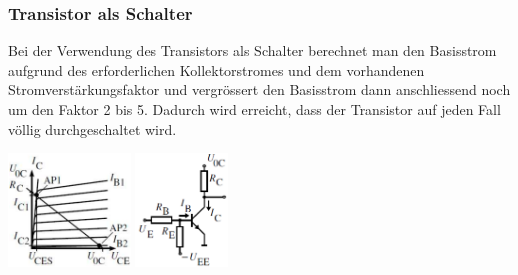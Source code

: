         \subsubsection{Transistor als Schalter}
            \begin{minipage}[T]{13cm}
                Bei der Verwendung des Transistors als Schalter berechnet man den Basisstrom aufgrund des erforderlichen Kollektorstromes und dem vorhandenen Stromverst\"arkungsfaktor und vergr\"ossert den Basisstrom dann anschliessend noch um den Faktor 2 bis 5. Dadurch wird erreicht, dass der Transistor auf jeden Fall v\"ollig durchgeschaltet wird.
            \end{minipage}
            \begin{minipage}[T]{6cm}
                \includegraphics[height=3cm]{./bilder/BipTrAlsSchalterKennl.png}
                \includegraphics[height=3cm]{./bilder/BipTrAlsSchalter.png}
            \end{minipage}
            
